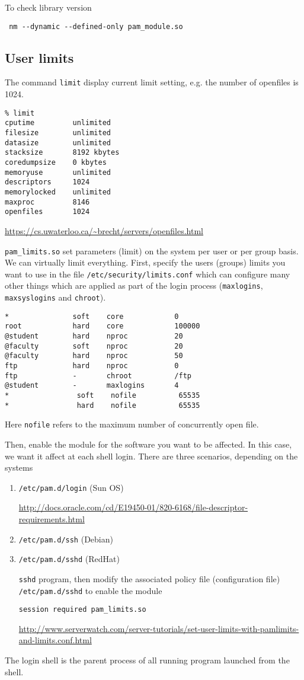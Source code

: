 To check library version
\begin{verbatim}
 nm --dynamic --defined-only pam_module.so
\end{verbatim}

\subsection{User limits}
\label{sec:pam_limit}

The command \verb!limit! display current limit setting, e.g. the number of
openfiles is 1024.
\begin{verbatim}
% limit
cputime         unlimited
filesize        unlimited
datasize        unlimited
stacksize       8192 kbytes
coredumpsize    0 kbytes
memoryuse       unlimited
descriptors     1024 
memorylocked    unlimited
maxproc         8146 
openfiles       1024 
\end{verbatim}
\url{https://cs.uwaterloo.ca/~brecht/servers/openfiles.html}

\verb!pam_limits.so! set parameters (limit) on the system per user or per group
basis. We can virtually limit everything. First, specify the users (groups)
limits you want to use in the file \verb!/etc/security/limits.conf! which can
configure many other things which are applied as part of the login process
(\verb!maxlogins!, \verb!maxsyslogins! and \verb!chroot!).

\begin{verbatim}
*               soft    core            0
root            hard    core            100000
@student        hard    nproc           20
@faculty        soft    nproc           20
@faculty        hard    nproc           50
ftp             hard    nproc           0
ftp             -       chroot          /ftp
@student        -       maxlogins       4
*                soft    nofile          65535
*                hard    nofile          65535
\end{verbatim}
Here \verb!nofile! refers to the maximum number of concurrently open file.

Then,  enable the module for the software you want to be affected. In this
case, we want it affect at each shell login. There are three scenarios,
depending on the systems
\begin{enumerate}
  \item \verb!/etc/pam.d/login! (Sun OS)
  
\url{http://docs.oracle.com/cd/E19450-01/820-6168/file-descriptor-requirements.html}

  \item \verb!/etc/pam.d/ssh! (Debian)
  \item \verb!/etc/pam.d/sshd! (RedHat)

\verb!sshd! program, then modify the associated policy file (configuration file)
\verb!/etc/pam.d/sshd! to enable the module
\begin{verbatim}
session required pam_limits.so
\end{verbatim}
\url{http://www.serverwatch.com/server-tutorials/set-user-limits-with-pamlimits-and-limits.conf.html}
\end{enumerate}
The login shell is the parent process of all running program launched from the
shell.



